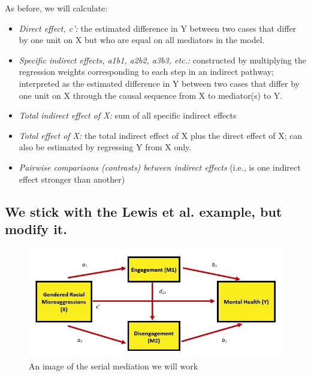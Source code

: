\documentclass[
  11pt,
]{book}
\providecommand{\tightlist}{%
  \setlength{\itemsep}{0pt}\setlength{\parskip}{0pt}}
\begin{document}
As before, we will calculate:

\begin{itemize}
\tightlist
\item
  \emph{Direct effect, c':} the estimated difference in Y between two cases that differ by one unit on X but who are equal on all mediators in the model.
\item
  \emph{Specific indirect effects, a1b1, a2b2, a3b3, etc.:} constructed by multiplying the regression weights corresponding to each step in an indirect pathway; interpreted as the estimated difference in Y between two cases that differ by one unit on X through the causal sequence from X to mediator(s) to Y.
\item
  \emph{Total indirect effect of X:} sum of all specific indirect effects
\item
  \emph{Total effect of X:} the total indirect effect of X plus the direct effect of X; can also be estimated by regressing Y from X only.
\item
  \emph{Pairwise comparisons (contrasts) between indirect effects} (i.e., is one indirect effect stronger than another)
\end{itemize}

\hypertarget{we-stick-with-the-lewis-et-al.--lewis_applying_2017-example-but-modify-it.}{%
\subsection{\texorpdfstring{We stick with the Lewis et al. \citeyearpar{lewis_applying_2017} example, but modify it.}{We stick with the Lewis et al. {[}-@lewis\_applying\_2017{]} example, but modify it.}}\label{we-stick-with-the-lewis-et-al.--lewis_applying_2017-example-but-modify-it.}}

\begin{figure}
\centering
\includegraphics{images/CompMed/LewisSerialMed.jpg}
\caption{An image of the serial mediation we will work}
\end{figure}
\end{document}
